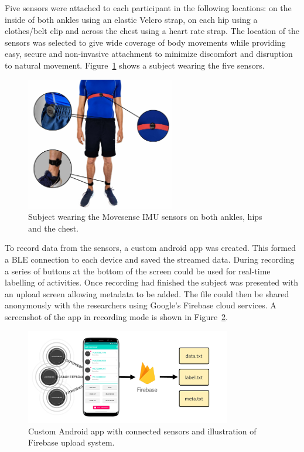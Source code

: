 Five sensors were attached to each participant in the following locations: on the inside of both ankles using an elastic Velcro strap, on each hip using a clothes/belt clip and across the chest using a heart rate strap. The location of the sensors was selected to give wide coverage of body movements while providing easy, secure and non-invasive attachment to minimize discomfort and disruption to natural movement. Figure~\ref{fig:movesense_sensors} shows a subject wearing the five sensors.

\begin{figure}[!hbt]
    \centering
    \includegraphics[height=220px]{content/4-LSTM_Behaviour/sensor_locations.jpg}
    \caption{Subject wearing the Movesense IMU sensors on both ankles, hips and the chest.}
    \label{fig:movesense_sensors}
\end{figure}

To record data from the sensors, a custom android app was created. This formed a BLE connection to each device and saved the streamed data. During recording a series of buttons at the bottom of the screen could be used for real-time labelling of activities. Once recording had finished the subject was presented with an upload screen allowing metadata to be added. The file could then be shared anonymously with the researchers using Google's Firebase cloud services. A screenshot of the app in recording mode is shown in Figure~\ref{fig:data_collection_diagrams}.

\begin{figure}[!hbt]
    \centering
    \includegraphics[width=0.8\textwidth]{content/4-LSTM_Behaviour/sensor_collection.pdf}
    \caption{Custom Android app with connected sensors and illustration of Firebase upload system.}
    \label{fig:data_collection_diagrams}
\end{figure}

